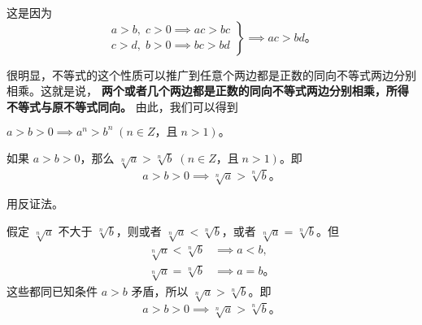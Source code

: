 这是因为
$$
\left.
    \begin{gathered}
        a > b,\; c > 0 \implies ac > bc \\
        c > d,\; b > 0 \implies bc > bd
    \end{gathered}
\right\} \implies ac > bd \text{。}
$$

很明显，不等式的这个性质可以推广到任意个两边都是正数的同向不等式两边分别相乘。这就是说，
\textbf{两个或者几个两边都是正数的同向不等式两边分别相乘，所得不等式与原不等式同向。}
由此，我们可以得到

\begin{corollary} \label{corollary:bds-4-2}
    $a > b > 0 \implies a^n > b^n \; (n \in Z \text{，且} \; n > 1) \text{。}$
\end{corollary}


\begin{theorem} \label{theorem:bds-5}
    如果 $a > b > 0$，那么 $\sqrt[n]{a} > \sqrt[n]{b} \; (n \in Z \text{，且} \; n > 1)$。即
    $$ a > b > 0 \implies \sqrt[n]{a} > \sqrt[n]{b} \text{。} $$
\end{theorem}

\zhengming 用反证法。

假定 $\sqrt[n]{a}$ 不大于 $\sqrt[n]{b}$，则或者 $\sqrt[n]{a} < \sqrt[n]{b}$，或者 $\sqrt[n]{a} = \sqrt[n]{b}$。但
\begin{align*}
    \sqrt[n]{a} < \sqrt[n]{b} & \implies a < b , \\
    \sqrt[n]{a} = \sqrt[n]{b} & \implies a = b \text{。}
\end{align*}
这些都同已知条件 $a > b$ 矛盾，所以 $\sqrt[n]{a} > \sqrt[n]{b}$。即
$$ a > b > 0 \implies \sqrt[n]{a} > \sqrt[n]{b} \text{。} $$


\lianxi


